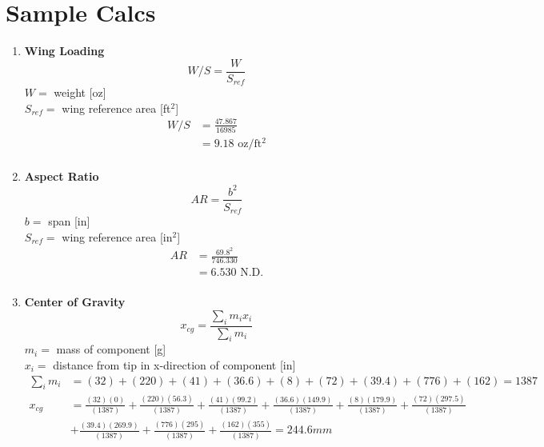 \appendix
\renewcommand{\thesection}{\textbf{Appendix \Alph{section}}}

\section{Sample Calcs} \label{apx:sample_calc}
\begin{enumerate}[wide,label=\textbf{\arabic*}., labelindent=0pt]

    \item \textbf{Wing Loading}
        \[W/S = \frac{W}{S_{ref}}\]
        $ W =$ weight [oz]\\
        $S_{ref} =$ wing reference area [ft$^2$]\\
        
        \begin{align*}
            W/S &= \frac{47.867}{16985}\\
            &= 9.18 \text{ oz/ft$^2$}\\
        \end{align*}
        
        \item \textbf{Aspect Ratio}
        \[AR = \frac{b^2}{S_{ref}}\]
        $ b =$ span [in]\\
        $S_{ref} =$ wing reference area [in$^2$]\\
        
        \begin{align*}
            AR &= \frac{69.8^2}{746.330}\\
            &= 6.530 \text{ N.D.}\\
        \end{align*}
    
    \item \textbf{Center of Gravity}
        \[x_{cg} = \frac{\sum_i m_i x_i }{\sum_i m_i}\]
        $ m_i =$ mass of component [g]\\
        $ x_i =$ distance from tip in x-direction of component [in]\\
    
        
        \begin{align*}
            \sum_i m_i &= (32)+(220)+(41)+(36.6)+(8)+(72)+(39.4)+(776)+(162) = 1387\\
            x_{cg} &= \frac{(32)(0)}{(1387)} + \frac{(220)(56.3)}{(1387)} + \frac{(41)(99.2)}{(1387)} + \frac{(36.6)(149.9)}{(1387)} + \frac{(8)(179.9)}{(1387)} + \frac{(72)(297.5)}{(1387)} \\
            &+ \frac{(39.4)(269.9)}{(1387)} + \frac{(776)(295)}{(1387)} + \frac{(162)(355)}{(1387)} = 244.6 mm\\
        \end{align*}
        

\end{enumerate}
